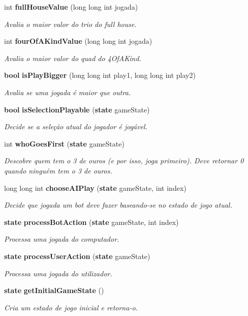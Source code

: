 \begin{DoxyCompactItemize}
int {\bf full\+House\+Value} (long long int jogada)
\begin{DoxyCompactList}\small\item\em Avalia o maior valor do trio do full house. \end{DoxyCompactList}\item 
int {\bf four\+Of\+A\+Kind\+Value} (long long int jogada)
\begin{DoxyCompactList}\small\item\em Avalia o maior valor do quad do 4\+Of\+A\+Kind. \end{DoxyCompactList}\item 
{\bf bool} {\bf is\+Play\+Bigger} (long long int play1, long long int play2)
\begin{DoxyCompactList}\small\item\em Avalia se uma jogada é maior que outra. \end{DoxyCompactList}\item 
{\bf bool} {\bf is\+Selection\+Playable} ({\bf state} game\+State)
\begin{DoxyCompactList}\small\item\em Decide se a seleção atual do jogador é jogável. \end{DoxyCompactList}\item 
int {\bf who\+Goes\+First} ({\bf state} game\+State)
\begin{DoxyCompactList}\small\item\em Descobre quem tem o 3 de ouros (e por isso, joga primeiro). Deve retornar 0 quando ninguém tem o 3 de ouros. \end{DoxyCompactList}\item 
long long int {\bf choose\+A\+I\+Play} ({\bf state} game\+State, int index)
\begin{DoxyCompactList}\small\item\em Decide que jogada um bot deve fazer baseando-\/se no estado de jogo atual. \end{DoxyCompactList}\item 
{\bf state} {\bf process\+Bot\+Action} ({\bf state} game\+State, int index)
\begin{DoxyCompactList}\small\item\em Processa uma jogada do computador. \end{DoxyCompactList}\item 
{\bf state} {\bf process\+User\+Action} ({\bf state} game\+State)
\begin{DoxyCompactList}\small\item\em Processa uma jogada do utilizador. \end{DoxyCompactList}\item 
{\bf state} {\bf get\+Initial\+Game\+State} ()
\begin{DoxyCompactList}\small\item\em Cria um estado de jogo inicial e retorna-\/o. \end{DoxyCompactList}\end{DoxyCompactItemize}


